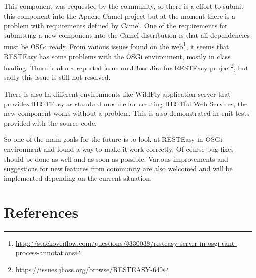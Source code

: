 \documentclass[12pt,final,oneside]{fithesis2}
\begin{document}
This component was requested by the community, so there is a effort to submit this component into the Apache Camel project but at the moment there is a problem with requirements defined by Camel. One of the requirements for submitting a new component into the Camel distribution is that all dependencies must be OSGi ready. From various issues found on the web\footnote{\url{http://stackoverflow.com/questions/8330038/resteasy-server-in-osgi-cant-process-annotations}}, it seems that RESTEasy has some problems with the OSGi environment, mostly in class loading. There is also a reported issue on JBoss Jira for RESTEasy project\footnote{\url{https://issues.jboss.org/browse/RESTEASY-640}}, but sadly this issue is still not resolved.

There is also  In different environments like WildFly application server that provides RESTEasy as standard module for creating RESTful Web Services, the new component works without a problem. This is also demonstrated in unit tests provided with the source code. 

So one of the main goals for the future is to look at RESTEasy in OSGi environment and found a way to make it work correctly. Of course bug fixes should be done as well and as soon as possible. Various improvements and suggestions for new features from community are also welcomed and will be implemented depending on the current situation.







\begingroup
\def\tmpchapter{0}
\renewcommand{\chaptername}{}
\renewcommand{\thechapter}{}
\chapter{References}
\renewcommand{\chapter}[2]{}%
\end{document}

